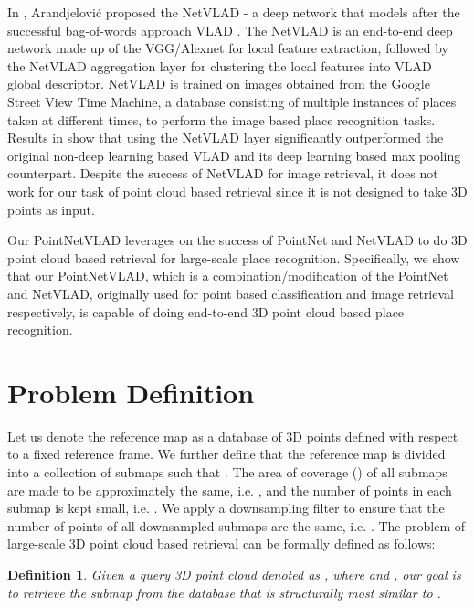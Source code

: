 \documentclass[10pt,twocolumn,letterpaper]{article}
\newtheorem{definition}{Definition}
\begin{document}
In \cite{Arandjelovic16}, Arandjelovi\'c  proposed the NetVLAD - a deep network that models after the successful bag-of-words approach VLAD \cite{conf/cvpr/JegouDSP10, Arandjelovic:2013}. The NetVLAD is an end-to-end deep network made up of the VGG/Alexnet \cite{Simonyan:2016, Alex:2012} for local feature extraction, followed by the NetVLAD aggregation layer for clustering the local features into VLAD global descriptor. NetVLAD is trained on images obtained from the Google Street View Time Machine, a database consisting of multiple instances of places taken at different times, to perform the image based place recognition tasks. Results in \cite{Arandjelovic16} show that using the NetVLAD layer significantly outperformed the original non-deep learning based VLAD and its deep learning based max pooling counterpart. Despite the success of NetVLAD for image retrieval, it does not work for our task of point cloud based retrieval since it is not designed to take 3D points as input. 


Our PointNetVLAD leverages on the success of PointNet \cite{qi2016pointnet} and NetVLAD \cite{Arandjelovic16} to do 3D point cloud based retrieval for large-scale place recognition. Specifically, we show that our PointNetVLAD, which is a combination/modification of the PointNet and NetVLAD, originally used for point based classification and image retrieval respectively, is capable of doing end-to-end 3D point cloud based place recognition. 


 	\section{Problem Definition}

Let us denote the reference map  as a database of 3D points defined with respect to a fixed reference frame. 
We further define that the reference map  is divided into a collection of  submaps  such that . The area of coverage () of all submaps are made to be approximately the same, i.e. , and the number of points in each submap is kept small, i.e. . 
We apply a downsampling filter  to ensure that the number of points of all downsampled submaps are the same, i.e. .
The problem of large-scale 3D point cloud based retrieval can be formally defined as follows:

\begin{definition}
Given a query 3D point cloud denoted as , where   and , our goal is to retrieve
the submap  from the database  that is structurally most similar to . 

\end{definition}
\end{document}
